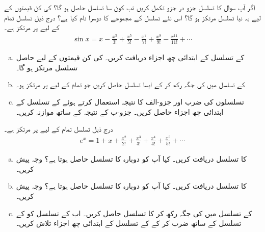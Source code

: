 اگر آپ سوال  کا تسلسل جزو در جزو تکمل کریں تب کون سا تسلسل حاصل ہو گا؟  کی کن قیمتوں کے لیے یہ نیا تسلسل مرتکز ہو گا؟ اس   نئے تسلسل کے مجموعے کا دوسرا نام کیا ہے؟
درج ذیل تسلسل تمام  کے لیے  پر مرتکز ہے۔
\begin{align*}
\sin x=x-\frac{x^3}{3!}+\frac{x^5}{5!}-\frac{x^7}{7!}+\frac{x^9}{9!}-\frac{x^{11}}{11!}+\cdots
\end{align*}
\begin{enumerate}[a.]
\item
  کے تسلسل کے ابتدائی چھ اجزاء دریافت کریں۔  کی کن قیمتوں کے لیے حاصل تسلسل مرتکز ہو گا۔  
\item
{} کے تسلسل میں  کی جگہ   رکھ  کر کے  ایسا تسلسل حاصل کریں جو تمام  کے لیے  پر مرتکز ہو۔
\item
 تسلسلوں کی ضرب اور جزو-الف کا نتیجہ استعمال کرتے ہوئے  کے تسلسل کے ابتدائی چھ اجزاء حاصل کریں۔ جزو-ب کے نتیجہ کے ساتھ موازنہ کریں۔
\end{enumerate}
درج ذیل تسلسل تمام  کے لیے  پر مرتکز ہے۔
\begin{align*}
e^x=1+x+\frac{x^2}{2!}+\frac{x^3}{3!}+\frac{x^4}{4!}+\frac{x^5}{5!}+\cdots
\end{align*}
\begin{enumerate}[a.]
\item
{} کا تسلسل دریافت کریں۔ کیا آپ کو دوبارہ  کا تسلسل حاصل ہوتا ہے؟ وجہ پیش کریں۔
\item
{} کا تسلسل دریافت کریں۔ کیا آپ کو دوبارہ  کا تسلسل حاصل ہوتا ہے؟ وجہ پیش کریں۔
\item
{} کے تسلسل میں  کی جگہ   رکھ کر    کا تسلسل حاصل کریں۔ اب  کے تسلسل کو   کے تسلسل کے ساتھ ضرب کر کے  کے تسلسل کے ابتدائی چھ اجزاء تلاش کریں۔
\end{enumerate}
